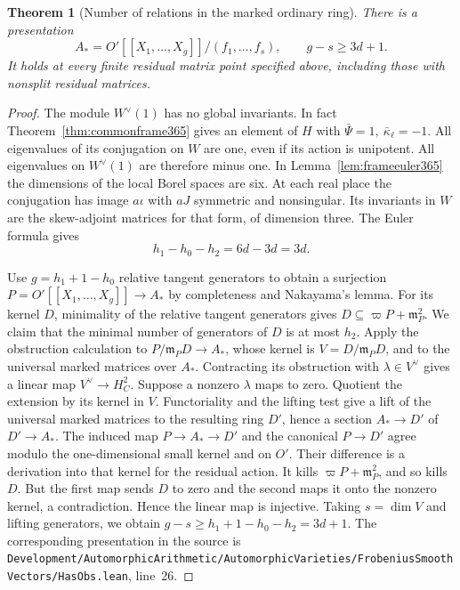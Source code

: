 \documentclass[a4paper,11pt]{article}
\newtheorem{theorem}[proposition]{Theorem}
\theoremstyle{definition}
\theoremstyle{remark}
\newcommand{\srcloc}[2]{{\small\nolinkurl{#1.lean}}, line~#2}
\numberwithin{equation}{section}
\begin{document}
\begin{theorem}[Number of relations in the marked ordinary ring]\leavevmode
\label{thm:markedpresentation420}
There is a presentation
\[
 A_*=O'[[X_1,\ldots,X_g]]/(f_1,\ldots,f_s),
                \qquad g-s\ge 3d+1.
\]
It holds at every finite residual matrix point specified above,
including those with nonsplit residual matrices.
\end{theorem}
\begin{proof}
The module \(W^\vee(1)\) has no global invariants. In fact
Theorem~\ref{thm:commonframe365} gives an element of \(H\) with
\(\bar\Psi=1,\ \bar\kappa_\ell=-1\). All eigenvalues of its
conjugation on \(W\) are one, even if its action is unipotent.
All eigenvalues on \(W^\vee(1)\) are therefore minus one.
In Lemma~\ref{lem:frameeuler365} the dimensions of the local
Borel spaces are six. At each real place the conjugation has
image \(a\iota\) with \(aJ\) symmetric and nonsingular. Its
invariants in \(W\) are the skew-adjoint matrices for that
form, of dimension three. The Euler formula gives
\[
                    h_1-h_0-h_2=6d-3d=3d .
\]

Use \(g=h_1+1-h_0\) relative tangent generators to obtain a
surjection \(P=O'[[X_1,\ldots,X_g]]\to A_*\) by completeness and
Nakayama's lemma. For its kernel \(D\), minimality of the relative
tangent generators gives
\(D\subseteq\varpi P+\mathfrak m_P^2\). We claim that the minimal
number of generators of \(D\) is at most \(h_2\).
Apply the obstruction calculation to
\(P/\mathfrak m_P D\to A_*\), whose kernel is
\(V=D/\mathfrak m_P D\), and to the universal marked matrices
over \(A_*\). Contracting its obstruction with
\(\lambda\in V^\vee\) gives a linear map \(V^\vee\to H_C^2\).
Suppose a nonzero \(\lambda\) maps to zero. Quotient the extension
by its kernel in \(V\). Functoriality and the lifting test give
a lift of the universal marked matrices to the resulting ring
\(D'\), hence a section \(A_*\to D'\) of \(D'\to A_*\).
The induced map \(P\to A_*\to D'\) and the canonical \(P\to D'\)
agree modulo the one-dimensional small kernel and on \(O'\).
Their difference is a derivation into that kernel for the
residual action. It kills \(\varpi P+\mathfrak m_P^2\), and so
kills \(D\). But the first map sends \(D\) to zero and the second
maps it onto the nonzero kernel, a contradiction. Hence the linear
map is injective. Taking \(s=\dim V\) and lifting generators, we
obtain \(g-s\ge h_1+1-h_0-h_2=3d+1\). The corresponding presentation
in the source is \srcloc{Development/AutomorphicArithmetic/AutomorphicVarieties/FrobeniusSmoothVectors/HasObs}{26}.
\end{proof}
\end{document}
